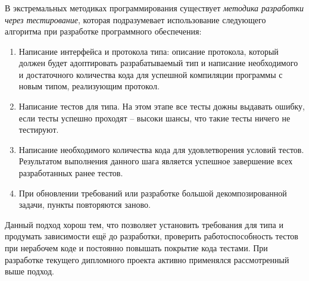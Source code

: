 \subsubsection{}
\label{sec:testing:unit:tdd}

В экстремальных методиках программирования существует \textit{методика разработки через тестирование}, которая подразумевает использование следующего алгоритма при разработке программного обеспечения:

\begin{enumerate}
	\item Написание интерфейса и протокола типа: описание протокола, который должен будет адоптировать разрабатываемый тип и написание необходимого и достаточного количества кода для успешной компиляции программы с новым типом, реализующим протокол.
	\item Написание тестов для типа. На этом этапе все тесты дожны выдавать ошибку, если тесты успешно проходят -- высоки шансы, что такие тесты ничего не тестируют.
	\item Написание необходимого количества кода для удовлетворения условий тестов. Результатом выполнения данного шага является успешное завершение всех разработанных ранее тестов.
	\item При обновлении требований или разработке большой декомпозированной задачи, пункты повторяются заново.
\end{enumerate}

Данный подход хорош тем, что позволяет установить требования для типа и продумать зависимости ещё до разработки, проверить работоспособность тестов при нерабочем коде и постоянно повышать покрытие кода тестами. При разработке текущего дипломного проекта активно применялся рассмотренный выше подход.